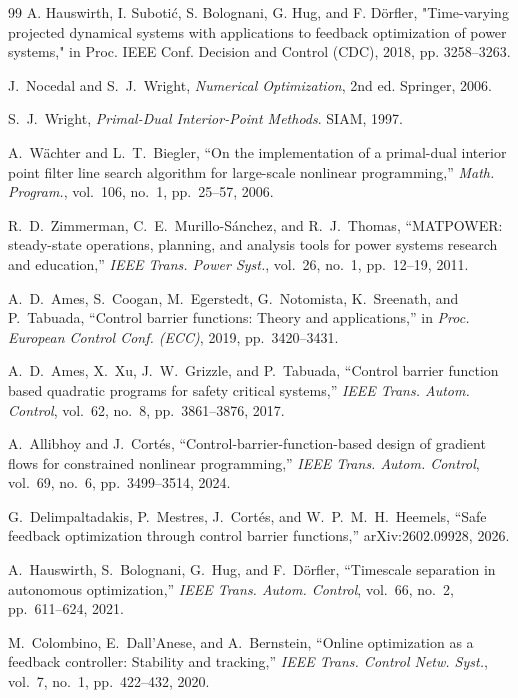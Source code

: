\documentclass[11pt,onecolumn]{article}
\theoremstyle{definition}
\theoremstyle{remark}
\begin{document}
\begin{thebibliography}{99}
\bibitem A. Hauswirth, I. Subotić, S. Bolognani, G. Hug, and F. Dörfler, "Time-varying projected dynamical systems with applications to feedback optimization of power systems," in Proc. IEEE Conf. Decision and Control (CDC), 2018, pp. 3258–3263.



J.~Nocedal and S.~J.~Wright, \emph{Numerical Optimization}, 2nd ed. Springer, 2006.

S.~J.~Wright, \emph{Primal-Dual Interior-Point Methods}. SIAM, 1997.

A.~W\"{a}chter and L.~T.~Biegler, ``On the implementation of a primal-dual interior point filter line search algorithm for large-scale nonlinear programming,'' \emph{Math. Program.}, vol.~106, no.~1, pp.~25--57, 2006.

R.~D.~Zimmerman, C.~E.~Murillo-S\'{a}nchez, and R.~J.~Thomas, ``MATPOWER: steady-state operations, planning, and analysis tools for power systems research and education,'' \emph{IEEE Trans. Power Syst.}, vol.~26, no.~1, pp.~12--19, 2011.

A.~D.~Ames, S.~Coogan, M.~Egerstedt, G.~Notomista, K.~Sreenath, and P.~Tabuada, ``Control barrier functions: Theory and applications,'' in \emph{Proc. European Control Conf. (ECC)}, 2019, pp.~3420--3431.

A.~D.~Ames, X.~Xu, J.~W.~Grizzle, and P.~Tabuada, ``Control barrier function based quadratic programs for safety critical systems,'' \emph{IEEE Trans. Autom. Control}, vol.~62, no.~8, pp.~3861--3876, 2017.

A.~Allibhoy and J.~Cort\'{e}s, ``Control-barrier-function-based design of gradient flows for constrained nonlinear programming,'' \emph{IEEE Trans. Autom. Control}, vol.~69, no.~6, pp.~3499--3514, 2024.

G.~Delimpaltadakis, P.~Mestres, J.~Cort\'{e}s, and W.~P.~M.~H.~Heemels, ``Safe feedback optimization through control barrier functions,'' arXiv:2602.09928, 2026.

A.~Hauswirth, S.~Bolognani, G.~Hug, and F.~D\"{o}rfler, ``Timescale separation in autonomous optimization,'' \emph{IEEE Trans. Autom. Control}, vol.~66, no.~2, pp.~611--624, 2021.

M.~Colombino, E.~Dall'Anese, and A.~Bernstein, ``Online optimization as a feedback controller: Stability and tracking,'' \emph{IEEE Trans. Control Netw. Syst.}, vol.~7, no.~1, pp.~422--432, 2020.


\end{thebibliography}
\end{document}
